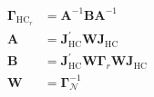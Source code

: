 \begin{equation}
    \begin{split}
	\boldsymbol{\Gamma}_{
		\mathrm{HC}_{r}
	}
	&
	=
	\mathbf{A}^{-1}
	\mathbf{B}
	\mathbf{A}^{-1}
	\\
	\mathbf{A}
	&
	=
	\mathbf{J}_{\mathrm{HC}}^{\prime}
	\mathbf{W}
	\mathbf{J}_{\mathrm{HC}}
	\\
	\mathbf{B}
	&
	=
	\mathbf{J}_{\mathrm{HC}}^{\prime}
	\mathbf{W}
	\boldsymbol{\Gamma}_{r}
	\mathbf{W}
	\mathbf{J}_{\mathrm{HC}}
	\\
	\mathbf{W}
	&
	=
	\boldsymbol{\Gamma}_{\mathcal{N}}^{-1}
    \end{split}
\end{equation}
